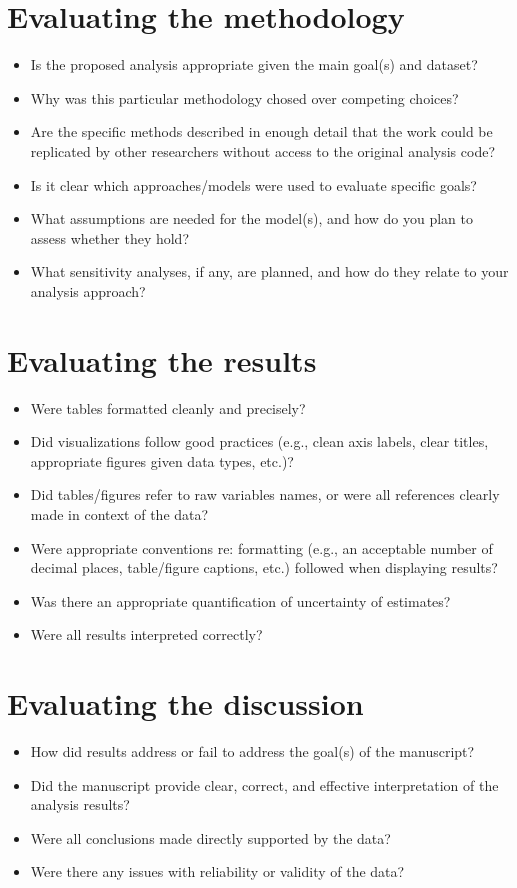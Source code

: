 \documentclass[titlepage, 12pt, leqno]{article}
\begin{document}
\pagebreak
\section{Evaluating the methodology}
\begin{itemize}
    \item Is the proposed analysis appropriate given the main goal(s) and 
        dataset?
    \item Why was this particular methodology chosed over competing choices?
    \item Are the specific methods described in enough detail that the work could
        be replicated by other researchers without access to the original
        analysis code?
    \item Is it clear which approaches/models were used to evaluate specific 
        goals?
    \item What assumptions are needed for the model(s), and how do you plan to
        assess whether they hold?
    \item What sensitivity analyses, if any, are planned, and how do they relate 
        to your analysis approach?
\end{itemize}

\pagebreak
\section{Evaluating the results}
\begin{itemize}
    \item Were tables formatted cleanly and precisely?
    \item Did visualizations follow good practices (e.g., clean axis labels,
        clear titles, appropriate figures given data types, etc.)?
    \item Did tables/figures refer to raw variables names, or were all references
        clearly made in context of the data?
    \item Were appropriate conventions re: formatting (e.g., an acceptable
        number of decimal places, table/figure captions, etc.) followed when
        displaying results?
    \item Was there an appropriate quantification of uncertainty of estimates?
    \item Were all results interpreted correctly?
\end{itemize}

\pagebreak
\section{Evaluating the discussion}
\begin{itemize}
    \item How did results address or fail to address the goal(s) of the 
        manuscript?
    \item Did the manuscript provide clear, correct, and effective interpretation
        of the analysis results?
    \item Were all conclusions made directly supported by the data?
    \item Were there any issues with reliability or validity of the data?
\end{itemize}
\end{document}
